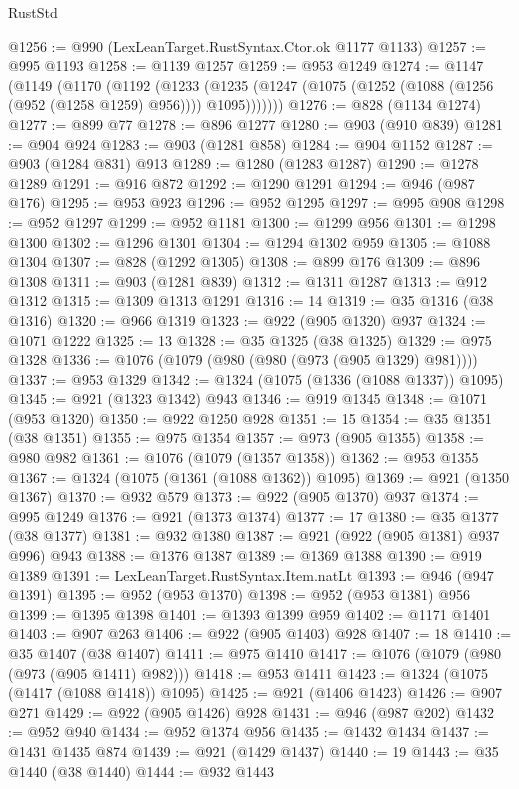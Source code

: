\begin{lexlean}{RustStd}
\begin{coremodule}
@1256 := @990 (LexLeanTarget.RustSyntax.Ctor.ok @1177 @1133)
@1257 := @995 @1193
@1258 := @1139 @1257
@1259 := @953 @1249
@1274 := @1147
    (@1149
      (@1170
        (@1192
          (@1233 (@1235 (@1247 (@1075 (@1252 (@1088 (@1256 (@952 (@1258 @1259) @956)))) @1095)))))))
@1276 := @828 (@1134 @1274)
@1277 := @899 @77
@1278 := @896 @1277
@1280 := @903 (@910 @839)
@1281 := @904 @924
@1283 := @903 (@1281 @858)
@1284 := @904 @1152
@1287 := @903 (@1284 @831) @913
@1289 := @1280 (@1283 @1287)
@1290 := @1278 @1289
@1291 := @916 @872
@1292 := @1290 @1291
@1294 := @946 (@987 @176)
@1295 := @953 @923
@1296 := @952 @1295
@1297 := @995 @908
@1298 := @952 @1297
@1299 := @952 @1181
@1300 := @1299 @956
@1301 := @1298 @1300
@1302 := @1296 @1301
@1304 := @1294 @1302 @959
@1305 := @1088 @1304
@1307 := @828 (@1292 @1305)
@1308 := @899 @176
@1309 := @896 @1308
@1311 := @903 (@1281 @839)
@1312 := @1311 @1287
@1313 := @912 @1312
@1315 := @1309 @1313 @1291
@1316 := 14
@1319 := @35 @1316 (@38 @1316)
@1320 := @966 @1319
@1323 := @922 (@905 @1320) @937
@1324 := @1071 @1222
@1325 := 13
@1328 := @35 @1325 (@38 @1325)
@1329 := @975 @1328
@1336 := @1076 (@1079 (@980 (@980 (@973 (@905 @1329) @981))))
@1337 := @953 @1329
@1342 := @1324 (@1075 (@1336 (@1088 @1337)) @1095)
@1345 := @921 (@1323 @1342) @943
@1346 := @919 @1345
@1348 := @1071 (@953 @1320)
@1350 := @922 @1250 @928
@1351 := 15
@1354 := @35 @1351 (@38 @1351)
@1355 := @975 @1354
@1357 := @973 (@905 @1355)
@1358 := @980 @982
@1361 := @1076 (@1079 (@1357 @1358))
@1362 := @953 @1355
@1367 := @1324 (@1075 (@1361 (@1088 @1362)) @1095)
@1369 := @921 (@1350 @1367)
@1370 := @932 @579
@1373 := @922 (@905 @1370) @937
@1374 := @995 @1249
@1376 := @921 (@1373 @1374)
@1377 := 17
@1380 := @35 @1377 (@38 @1377)
@1381 := @932 @1380
@1387 := @921 (@922 (@905 @1381) @937 @996) @943
@1388 := @1376 @1387
@1389 := @1369 @1388
@1390 := @919 @1389
@1391 := LexLeanTarget.RustSyntax.Item.natLt
@1393 := @946 (@947 @1391)
@1395 := @952 (@953 @1370)
@1398 := @952 (@953 @1381) @956
@1399 := @1395 @1398
@1401 := @1393 @1399 @959
@1402 := @1171 @1401
@1403 := @907 @263
@1406 := @922 (@905 @1403) @928
@1407 := 18
@1410 := @35 @1407 (@38 @1407)
@1411 := @975 @1410
@1417 := @1076 (@1079 (@980 (@973 (@905 @1411) @982)))
@1418 := @953 @1411
@1423 := @1324 (@1075 (@1417 (@1088 @1418)) @1095)
@1425 := @921 (@1406 @1423)
@1426 := @907 @271
@1429 := @922 (@905 @1426) @928
@1431 := @946 (@987 @202)
@1432 := @952 @940
@1434 := @952 @1374 @956
@1435 := @1432 @1434
@1437 := @1431 @1435 @874
@1439 := @921 (@1429 @1437)
@1440 := 19
@1443 := @35 @1440 (@38 @1440)
@1444 := @932 @1443

\end{coremodule}
\end{lexlean}
